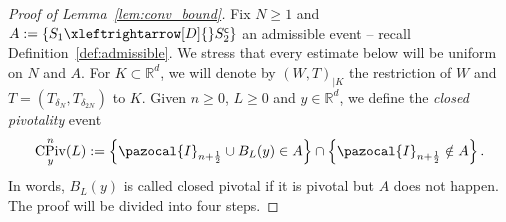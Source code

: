 \documentclass[10pt]{amsart}
\theoremstyle{definition}\newtheorem{defi}[theo]{Definition}\newtheorem{rema}[theo]{Remark}\newtheorem{exam}[theo]{Example}\newtheorem{exem}[theo]{Example}\newtheorem{nota}[theo]{Notation}
\DeclareMathOperator{\CPiv}{CPiv}
\newcommand{\R}{\mathbb{R}}
\newcommand{\sfc}{\mathsf{c}}
\newcommand{\lr}[4]{#3\xleftrightarrow[#1]{#2} #4}
\begin{document}
\begin{proof}[Proof of Lemma~\ref{lem:conv_bound}]
Fix $N\geq1$ and {\small$A:=\{\lr{D}{}{S_1}{S_2^{\sfc}}\}$} an admissible event -- recall Definition~\ref{def:admissible}. We stress that every estimate below will be uniform on $N$ and $A$. For $K\subset \R^d$, we will denote by $(W,T)_{|K}$ the restriction of $W$ and $T=(T_{\delta_N},T_{\delta_{2N}})$ to $K$. Given $n\geq0$, $L \geq 0$ and $y\in\R^d$, we define the \emph{closed pivotality} event
\begin{equation}\label{eq:cpiv_def}
\CPiv^n_y(L):=\left\{\pazocal{I}_{n+\frac12}\cup B_{L}(y) \in A\right\}\cap \left\{\pazocal{I}_{n+\frac12} \notin A\right\}.
\end{equation}
In words, $B_L(y)$ is called closed pivotal if it is pivotal but $A$ does not happen. The proof will be divided into four steps.


\end{proof}
\end{document}
